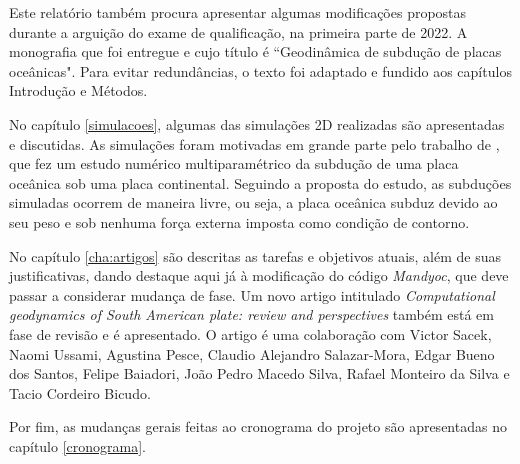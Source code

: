 
Este relatório também procura apresentar algumas modificações propostas durante a arguição do exame de qualificação, na primeira parte de 2022. A monografia que foi entregue e cujo título é ``Geodinâmica de subdução de placas oceânicas". Para evitar redundâncias, o texto foi adaptado e fundido aos capítulos Introdução e Métodos.

No capítulo \ref{simulacoes}, algumas das simulações 2D realizadas são apresentadas e discutidas. As simulações foram motivadas em grande parte pelo trabalho de \cite{strak2021thermo}, que fez um estudo numérico multiparamétrico da subdução de uma placa oceânica sob uma placa continental. Seguindo a proposta do estudo, as subduções simuladas ocorrem de maneira livre, ou seja, a placa oceânica subduz devido ao seu peso e sob nenhuma força externa imposta como condição de contorno.

No capítulo \ref{cha:artigos} são descritas as tarefas e objetivos atuais, além de suas justificativas, dando destaque aqui já à modificação do código \textit{Mandyoc}, que deve passar a considerar mudança de fase. Um novo artigo intitulado \textit{Computational geodynamics of South American plate: review and perspectives} também está em fase de revisão e é apresentado. O artigo é uma colaboração com Victor Sacek, Naomi Ussami, Agustina Pesce, Claudio Alejandro Salazar-Mora, Edgar Bueno dos Santos, Felipe Baiadori, João Pedro Macedo Silva, Rafael Monteiro da Silva e Tacio Cordeiro Bicudo.

Por fim, as mudanças gerais feitas ao cronograma do projeto são apresentadas no capítulo \ref{cronograma}.

